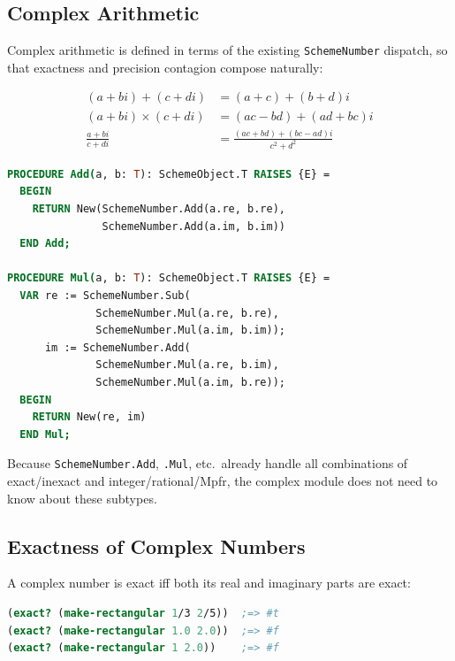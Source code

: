 \documentclass[12pt]{article}
\begin{document}
\subsection{Complex Arithmetic}

Complex arithmetic is defined in terms of the existing
{\tt SchemeNumber} dispatch, so that exactness and precision
contagion compose naturally:

\begin{align*}
(a + bi) + (c + di) &= (a+c) + (b+d)i \\
(a + bi) \times (c + di) &= (ac - bd) + (ad + bc)i \\
\frac{a + bi}{c + di} &= \frac{(ac + bd) + (bc - ad)i}{c^2 + d^2}
\end{align*}

\begin{lstlisting}[language=Modula3]
PROCEDURE Add(a, b: T): SchemeObject.T RAISES {E} =
  BEGIN
    RETURN New(SchemeNumber.Add(a.re, b.re),
               SchemeNumber.Add(a.im, b.im))
  END Add;

PROCEDURE Mul(a, b: T): SchemeObject.T RAISES {E} =
  VAR re := SchemeNumber.Sub(
              SchemeNumber.Mul(a.re, b.re),
              SchemeNumber.Mul(a.im, b.im));
      im := SchemeNumber.Add(
              SchemeNumber.Mul(a.re, b.im),
              SchemeNumber.Mul(a.im, b.re));
  BEGIN
    RETURN New(re, im)
  END Mul;
\end{lstlisting}

\noindent Because {\tt SchemeNumber.Add}, {\tt .Mul}, etc.\ already
handle all combinations of exact/inexact and integer/rational/Mpfr,
the complex module does not need to know about these subtypes.

\subsection{Exactness of Complex Numbers}

A complex number is exact iff both its real and imaginary parts are
exact:

\begin{lstlisting}[language=Scheme]
(exact? (make-rectangular 1/3 2/5))  ;=> #t
(exact? (make-rectangular 1.0 2.0))  ;=> #f
(exact? (make-rectangular 1 2.0))    ;=> #f
\end{lstlisting}
\end{document}
